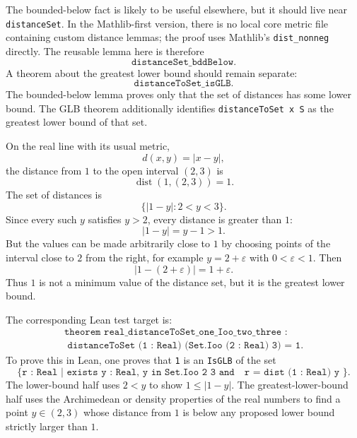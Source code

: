 \begin{remark*}
The bounded-below fact is likely to be useful elsewhere, but it should live
near \texttt{distanceSet}. In the Mathlib-first version, there is no local core
metric file containing custom distance lemmas; the proof uses Mathlib's
\texttt{dist\_nonneg} directly. The reusable lemma here is therefore
\[
  \texttt{distanceSet\_bddBelow}.
\]
A theorem about the greatest lower bound should remain separate:
\[
  \texttt{distanceToSet\_isGLB}.
\]
The bounded-below lemma proves only that the set of distances has some lower
bound. The GLB theorem additionally identifies \texttt{distanceToSet x S} as
the greatest lower bound of that set.
\end{remark*}

\begin{example*}
On the real line with its usual metric,
\[
  d(x,y) = |x-y|,
\]
the distance from $1$ to the open interval $(2,3)$ is
\[
  \operatorname{dist}(1,(2,3)) = 1.
\]
The set of distances is
\[
  \{ |1-y| : 2 < y < 3 \}.
\]
Since every such $y$ satisfies $y>2$, every distance is greater than $1$:
\[
  |1-y| = y-1 > 1.
\]
But the values can be made arbitrarily close to $1$ by choosing points of the
interval close to $2$ from the right, for example $y = 2+\varepsilon$ with
$0<\varepsilon<1$. Then
\[
  |1-(2+\varepsilon)| = 1+\varepsilon.
\]
Thus $1$ is not a minimum value of the distance set, but it is the greatest
lower bound.

The corresponding Lean test target is:
\[
\begin{gathered}
  \texttt{theorem real\_distanceToSet\_one\_Ioo\_two\_three :}\\
  \texttt{\ \ distanceToSet (1 : Real) (Set.Ioo (2 : Real) 3) = 1.}
\end{gathered}
\]
To prove this in Lean, one proves that \texttt{1} is an
\texttt{IsGLB} of the set
\[
  \texttt{\{ r : Real | exists y : Real, y in Set.Ioo 2 3 and}
  \quad
  \texttt{r = dist (1 : Real) y \}}.
\]
The lower-bound half uses $2<y$ to show $1 \le |1-y|$. The greatest-lower-bound
half uses the Archimedean or density properties of the real numbers to find a
point $y \in (2,3)$ whose distance from $1$ is below any proposed lower bound
strictly larger than $1$.
\end{example*}
